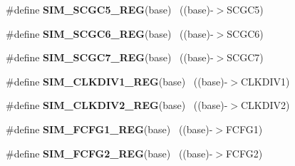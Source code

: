 \begin{DoxyCompactItemize}
\item 
\hypertarget{group___s_i_m___register___accessor___macros_gaf51026d4b580eca5948ae938148192e9}{}\#define {\bfseries S\+I\+M\+\_\+\+S\+C\+G\+C5\+\_\+\+R\+E\+G}(base)                                        ~((base)-\/$>$S\+C\+G\+C5)\label{group___s_i_m___register___accessor___macros_gaf51026d4b580eca5948ae938148192e9}

\item 
\hypertarget{group___s_i_m___register___accessor___macros_ga0d700471b59fa17a37db41eea9ac34d4}{}\#define {\bfseries S\+I\+M\+\_\+\+S\+C\+G\+C6\+\_\+\+R\+E\+G}(base)                                        ~((base)-\/$>$S\+C\+G\+C6)\label{group___s_i_m___register___accessor___macros_ga0d700471b59fa17a37db41eea9ac34d4}

\item 
\hypertarget{group___s_i_m___register___accessor___macros_ga8524b7aa144aa516fbbc9ac2da38c7b0}{}\#define {\bfseries S\+I\+M\+\_\+\+S\+C\+G\+C7\+\_\+\+R\+E\+G}(base)                                        ~((base)-\/$>$S\+C\+G\+C7)\label{group___s_i_m___register___accessor___macros_ga8524b7aa144aa516fbbc9ac2da38c7b0}

\item 
\hypertarget{group___s_i_m___register___accessor___macros_ga9a2e39cdabbfa7d094a5442016be4dd0}{}\#define {\bfseries S\+I\+M\+\_\+\+C\+L\+K\+D\+I\+V1\+\_\+\+R\+E\+G}(base)                                    ~((base)-\/$>$C\+L\+K\+D\+I\+V1)\label{group___s_i_m___register___accessor___macros_ga9a2e39cdabbfa7d094a5442016be4dd0}

\item 
\hypertarget{group___s_i_m___register___accessor___macros_gaddf08644ec398256d25e6106daad245b}{}\#define {\bfseries S\+I\+M\+\_\+\+C\+L\+K\+D\+I\+V2\+\_\+\+R\+E\+G}(base)                                    ~((base)-\/$>$C\+L\+K\+D\+I\+V2)\label{group___s_i_m___register___accessor___macros_gaddf08644ec398256d25e6106daad245b}

\item 
\hypertarget{group___s_i_m___register___accessor___macros_ga6cc80fd9f1edfd8f709d2c8fe3c97080}{}\#define {\bfseries S\+I\+M\+\_\+\+F\+C\+F\+G1\+\_\+\+R\+E\+G}(base)                                        ~((base)-\/$>$F\+C\+F\+G1)\label{group___s_i_m___register___accessor___macros_ga6cc80fd9f1edfd8f709d2c8fe3c97080}

\item 
\hypertarget{group___s_i_m___register___accessor___macros_ga8e1caad19971280346dc9c767c8f4b6e}{}\#define {\bfseries S\+I\+M\+\_\+\+F\+C\+F\+G2\+\_\+\+R\+E\+G}(base)                                        ~((base)-\/$>$F\+C\+F\+G2)\label{group___s_i_m___register___accessor___macros_ga8e1caad19971280346dc9c767c8f4b6e}


\end{DoxyCompactItemize}
